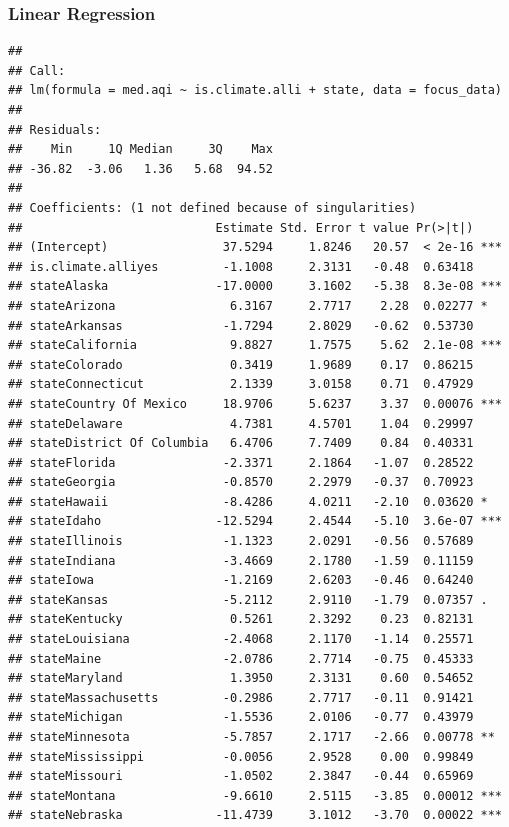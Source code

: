 \documentclass[
  ignorenonframetext,
]{beamer}
\begin{document}
\begin{frame}[fragile]
\frametitle{Linear Regression}

\begin{verbatim}
## 
## Call:
## lm(formula = med.aqi ~ is.climate.alli + state, data = focus_data)
## 
## Residuals:
##    Min     1Q Median     3Q    Max 
## -36.82  -3.06   1.36   5.68  94.52 
## 
## Coefficients: (1 not defined because of singularities)
##                           Estimate Std. Error t value Pr(>|t|)    
## (Intercept)                37.5294     1.8246   20.57  < 2e-16 ***
## is.climate.alliyes         -1.1008     2.3131   -0.48  0.63418    
## stateAlaska               -17.0000     3.1602   -5.38  8.3e-08 ***
## stateArizona                6.3167     2.7717    2.28  0.02277 *  
## stateArkansas              -1.7294     2.8029   -0.62  0.53730    
## stateCalifornia             9.8827     1.7575    5.62  2.1e-08 ***
## stateColorado               0.3419     1.9689    0.17  0.86215    
## stateConnecticut            2.1339     3.0158    0.71  0.47929    
## stateCountry Of Mexico     18.9706     5.6237    3.37  0.00076 ***
## stateDelaware               4.7381     4.5701    1.04  0.29997    
## stateDistrict Of Columbia   6.4706     7.7409    0.84  0.40331    
## stateFlorida               -2.3371     2.1864   -1.07  0.28522    
## stateGeorgia               -0.8570     2.2979   -0.37  0.70923    
## stateHawaii                -8.4286     4.0211   -2.10  0.03620 *  
## stateIdaho                -12.5294     2.4544   -5.10  3.6e-07 ***
## stateIllinois              -1.1323     2.0291   -0.56  0.57689    
## stateIndiana               -3.4669     2.1780   -1.59  0.11159    
## stateIowa                  -1.2169     2.6203   -0.46  0.64240    
## stateKansas                -5.2112     2.9110   -1.79  0.07357 .  
## stateKentucky               0.5261     2.3292    0.23  0.82131    
## stateLouisiana             -2.4068     2.1170   -1.14  0.25571    
## stateMaine                 -2.0786     2.7714   -0.75  0.45333    
## stateMaryland               1.3950     2.3131    0.60  0.54652    
## stateMassachusetts         -0.2986     2.7717   -0.11  0.91421    
## stateMichigan              -1.5536     2.0106   -0.77  0.43979    
## stateMinnesota             -5.7857     2.1717   -2.66  0.00778 ** 
## stateMississippi           -0.0056     2.9528    0.00  0.99849    
## stateMissouri              -1.0502     2.3847   -0.44  0.65969    
## stateMontana               -9.6610     2.5115   -3.85  0.00012 ***
## stateNebraska             -11.4739     3.1012   -3.70  0.00022 ***

\end{verbatim}
\end{frame}
\end{document}
